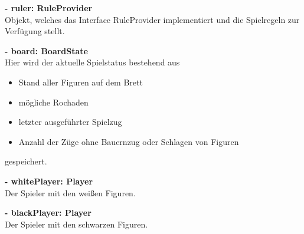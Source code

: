 \documentclass[parskip=full]{scrartcl}
\begin{document}
				\begin{description}
					 \item \textbf{- ruler: RuleProvider}\\ Objekt, welches das Interface RuleProvider implementiert und die Spielregeln zur Verfügung stellt.
					 \item \textbf{- board: BoardState}\\ Hier wird der aktuelle Spielstatus bestehend aus
					 \begin{itemize}
					 
			\item Stand aller Figuren auf dem Brett
			\item mögliche Rochaden
			\item letzter ausgeführter Spielzug
			\item Anzahl der Züge ohne Bauernzug oder Schlagen von Figuren
			  \end{itemize}	
			  	 gespeichert.
					 \item \textbf{- whitePlayer: Player}\\ Der Spieler mit den weißen Figuren.
					 \item \textbf{- blackPlayer: Player}\\ Der Spieler mit den schwarzen Figuren.\\
			    \\
				\end{description} 
				
\end{document}
